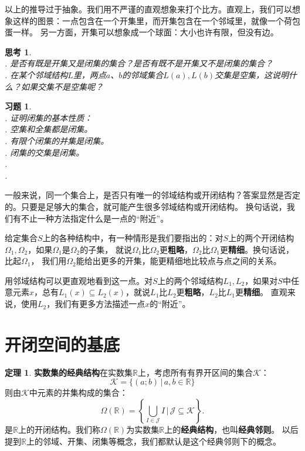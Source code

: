 \documentclass[12pt,UTF8]{ctexbook}
\theoremstyle{definition}
\newtheorem{tm}{定理}[section]
\theoremstyle{plain}
\newtheorem{sk}{思考}[section]
\newtheorem{xt}{习题}[section]
\begin{document}
\begin{appendix}
以上的推导过于抽象。我们用不严谨的直观想象来打个比方。直观上，我们可以想象这样的图景：一点包含在一个开集里，而开集包含在一个邻域里，就像一个荷包蛋一样。
另一方面，开集可以想象成一个球面：大小也许有限，但没有边。

\begin{sk}
    \mbox{} \\
    . 是否有既是开集又是闭集的集合？是否有既不是开集又不是闭集的集合？\\
    . 在某个邻域结构$L$里，两点$a$、$b$的邻域集合$L(a), L(b)$交集是空集，这说明什么？如果交集不是空集呢？
\end{sk}

\begin{xt}
    \mbox{} \\
    . 证明闭集的基本性质：\\
    . 空集和全集都是闭集。\\
    . 有限个闭集的并集是闭集。\\
    . 闭集的交集是闭集。\\
    . \\
    .
\end{xt}

一般来说，同一个集合上，是否只有唯一的邻域结构或开闭结构？答案显然是否定的。只要是足够大的集合，就可能产生很多邻域结构或开闭结构。
换句话说，我们有不止一种方法指定什么是一点的“附近”。

给定集合$S$上的各种结构中，有一种情形是我们要指出的：对$S$上的两个开闭结构$\Omega_1, \Omega_2$，如果$\Omega_1$是$\Omega_2$的子集，
就说$\Omega_1$比$\Omega_2$更\textbf{粗略}，$\Omega_2$比$\Omega_1$更\textbf{精细}。换句话说，比起$\Omega_1$，
我们用$\Omega_2$能给出更多的开集，能更精细地比较点与点之间的关系。

用邻域结构可以更直观地看到这一点。对$S$上的两个邻域结构$L_1, L_2$，如果对$S$中任意元素$x$，总有$L_1(x) \subseteq L_2(x)$，就说$L_1$比$L_2$更\textbf{粗略}，$L_2$比$L_1$更\textbf{精细}。
直观来说，使用$L_2$，我们有更多方法描述一点$x$的“附近”。

\section{开闭空间的基底}

\begin{tm}{\textbf{实数集的经典结构}}\label{tm:a-1-0}
    在实数集$\mathbb{R}$上，考虑所有有界开区间的集合$\mathcal{K}$：
    $$ \mathcal{K} = \{ (a;b) \, | \, a, b \in \mathbb{R} \}$$
    则由$\mathcal{K}$中元素的并集构成的集合：
    $$ \Omega(\mathbb{R}) = \left\{\bigcup_{I \in \mathcal{J}} I \, \Bigg| \,\mathcal{J} \subseteq  \mathcal{K} \right\}.$$
    是$\mathbb{R}$上的开闭结构。我们称$\Omega(\mathbb{R})$为实数集$\mathbb{R}$上的\textbf{经典结构}，也叫\textbf{经典邻则}。
    以后提到$\mathbb{R}$上的邻域、开集、闭集等概念，我们都默认是这个经典邻则下的概念。
\end{tm}


\end{appendix}
\end{document}
